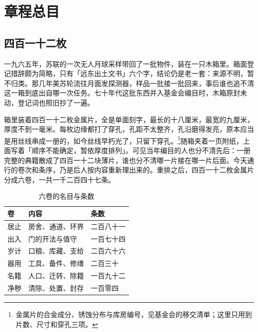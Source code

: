 \chapter{章程总目}


\section{四百一十二枚}

一九六五年，苏联的一次无人月球采样带回了一批物件，装在一只木箱里。箱面登记措辞颇为简略，只有「远东出土文书」六个字，结论仍是老一套：来源不明，暂不归类。那几年美苏轮流往月面发探测器，样品一批接一批回来，事后谁也追不清这一箱到底出自哪一次任务。七十年代这批东西并入基金会编目时，木箱原封未动，登记词也照旧抄了一遍。

箱里装着四百一十二枚金属片，全是单面刻字，最长的十八厘米，最宽的九厘米，厚度不到一毫米。每枚边缘都打了穿孔，孔距不太整齐，孔沿磨得发亮，原本应当是用丝线串成一册的，如今丝线早朽光了，只留下穿孔。\footnote{金属片的合金成分、锈蚀分布与库房编号，见基金会的移交清单；这里只用到片数、尺寸和穿孔三项。}随箱夹着一页附纸，上面写着「顺序不能确定，暂依厚度排列」。可见当年编目的人也分不清先后：一册完整的典籍散成了四百一十二块薄片，谁也分不清哪一片接在哪一片后面。今天通行的卷次和条序，乃是后人按内容重新理出来的。重排之后，四百一十二枚金属片分成六卷，一共一千二百四十七条。

\begin{table}[htbp]
  \centering
  \caption{六卷的名目与条数}
  \begin{tabular}{@{}lll@{}}
    \toprule
    卷 & 内容 & 条数\\
    \midrule
    居止 & 房舍、通道、环界 & 二百八十一 \\
    出入 & 门的开法与值守 & 一百七十四 \\
    岁计 & 口粮、库藏、支给 & 二百六十六 \\
    器用 & 工具、备件、修缮 & 二百三十 \\
    名籍 & 人口、迁转、除籍 & 一百九十二 \\
    净秽 & 清除、处置、封存 & 一百零四 \\
    \bottomrule
  \end{tabular}
\end{table}

